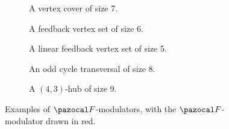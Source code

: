 \begin{figure}
    \centering
    \begin{subfigure}[b]{0.22\textwidth}
        \caption{A vertex cover of size 7.}
    \end{subfigure}
    \hspace{1cm}
    \begin{subfigure}[b]{0.22\textwidth}
        \caption{A feedback vertex set of size 6.}
    \end{subfigure}
    \hspace{1cm}
    \begin{subfigure}[b]{0.18\textwidth}
        \caption{A linear feedback vertex set of size 5.}
    \end{subfigure}

    \begin{subfigure}[b]{0.18\textwidth}
        \caption{An odd cycle transversal of size 8.}
    \end{subfigure}
    \hspace{1cm}
    \begin{subfigure}[b]{0.2\textwidth}
        \caption{A $(4, 3)$-hub of size 9.}
    \end{subfigure}

    

    \caption{Examples of $\F$-modulators, with the $\F$-modulator drawn in red.}
    \label{fig:fkv-graph-example}
\end{figure}